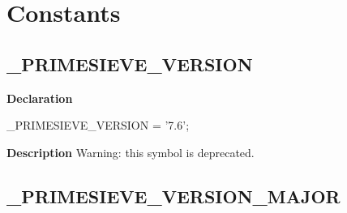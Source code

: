 \documentclass{report}
\newif\ifpdf
\begin{document}
\section{Constants}
\ifpdf
\subsection*{\large{\textbf{{\_}PRIMESIEVE{\_}VERSION}}\normalsize\hspace{1ex}\hrulefill}
\else
\subsection*{{\_}PRIMESIEVE{\_}VERSION}
\fi
\label{primesieve-_PRIMESIEVE_VERSION}
\begin{list}{}{
\setlength{\itemindent}{0cm}
\setlength{\listparindent}{0cm}
\setlength{\leftmargin}{\evensidemargin}
\addtolength{\leftmargin}{\tmplength}
\settowidth{\labelsep}{X}
\addtolength{\leftmargin}{\labelsep}
\setlength{\labelwidth}{\tmplength}
}
\item[\textbf{Declaration}\hfill]
\ifpdf
\begin{flushleft}
\fi
\begin{ttfamily}
{\_}PRIMESIEVE{\_}VERSION = '7.6';\end{ttfamily}

\ifpdf
\end{flushleft}
\fi

\par
\item[\textbf{Description}]
Warning: this symbol is deprecated.

 

\end{list}
\ifpdf
\subsection*{\large{\textbf{{\_}PRIMESIEVE{\_}VERSION{\_}MAJOR}}\normalsize\hspace{1ex}\hrulefill}
\else
\end{document}
